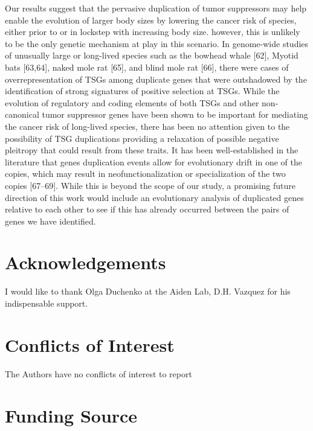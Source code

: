 \documentclass[]{elsarticle} %
\begin{document}
Our results suggest that the pervasive duplication of tumor suppressors may help enable the evolution of larger body sizes by lowering the cancer risk of species, either prior to or in lockstep with increasing body size. however, this is unlikely to be the only genetic mechanism at play in this scenario. In genome-wide studies of unusually large or long-lived species such as the bowhead whale {[}62{]}, Myotid bats {[}63,64{]}, naked mole rat {[}65{]}, and blind mole rat {[}66{]}, there were cases of overrepresentation of TSGs among duplicate genes that were outshadowed by the identification of strong signatures of positive selection at TSGs. While the evolution of regulatory and coding elements of both TSGs and other non-canonical tumor suppressor genes have been shown to be important for mediating the cancer risk of long-lived species, there has been no attention given to the possibility of TSG duplications providing a relaxation of possible negative pleitropy that could result from these traits. It has been well-established in the literature that genes duplication events allow for evolutionary drift in one of the copies, which may result in neofunctionalization or specialization of the two copies {[}67--69{]}. While this is beyond the scope of our study, a promising future direction of this work would include an evolutionary analysis of duplicated genes relative to each other to see if this has already occurred between the pairs of genes we have identified.

\hypertarget{acknowledgements}{%
\section{Acknowledgements}\label{acknowledgements}}

I would like to thank Olga Duchenko at the Aiden Lab, D.H. Vazquez for his indispensable support.

\hypertarget{conflicts-of-interest}{%
\section{Conflicts of Interest}\label{conflicts-of-interest}}

The Authors have no conflicts of interest to report

\hypertarget{funding-source}{%
\section{Funding Source}\label{funding-source}}
\end{document}
